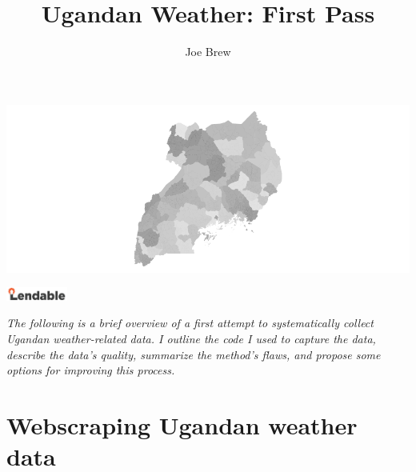 \documentclass[11pt]{article}
\begin{document}


\title{\textbf{Ugandan Weather: First Pass}}
\author{Joe Brew}

\maketitle

\begin{center}
\includegraphics{uganda_weather_first_pass-001}
\end{center}

\begin{center}
\includegraphics[width=2cm]{logo}
\end{center}


\emph{\noindent The following is a brief overview of a first attempt to systematically collect Ugandan weather-related data.  I outline the code I used to capture the data, describe the data's quality, summarize the method's flaws, and propose some options for improving this process. }
\tableofcontents

\vspace{10mm}





\section*{Webscraping Ugandan weather data}
\hrulefill
\end{document}
